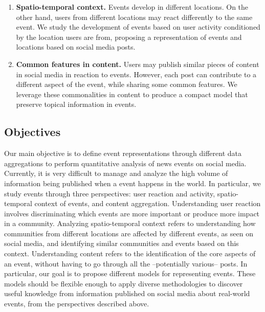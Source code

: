 \begin{intro}
\begin{enumerate}
    \item {\bf Spatio-temporal context.} 
    Events develop in different locations. 
    On the other hand, users from different locations may react differently to
    the same event.
    We study the development of events based on user activity conditioned by the
    location users are from, proposing a representation of events and locations
    based on social media posts.

    \item {\bf Common features in content.} 
    Users may publish similar pieces of content in social media in reaction to
    events.
    However, each post can contribute to a different aspect of the event, while
    sharing some common features.
    We leverage these commonalities in content to produce a compact model that
    preserve topical information in events.
    
\end{enumerate}


\subsection*{Objectives}

Our main objective is to define event representations through different data
aggregations to perform quantitative analysis of news events on social media.
%
Currently, it is very difficult to manage and analyze the high volume of
information being published when a event happens in the world. 
%
In particular, we study events through three perspectives: user reaction
and activity, spatio-temporal context of events, and content aggregation.
%
Understanding user reaction involves discriminating which events are more
important or produce more impact in a community. 
%
Analyzing spatio-temporal context refers to understanding how communities from
different locations are affected by different events, as seen on social media,
and identifying similar communities and events based on this context. 
%
Understanding content refers to the identification of the core aspects of an
event, without having to go through all the --potentially various-- posts.
%
In particular, our goal is to propose different models for representing events. 
%
These models should be flexible enough to apply diverse methodologies to
discover useful knowledge from information published on social media about
real-world events, from the perspectives described above. 




\end{intro}
